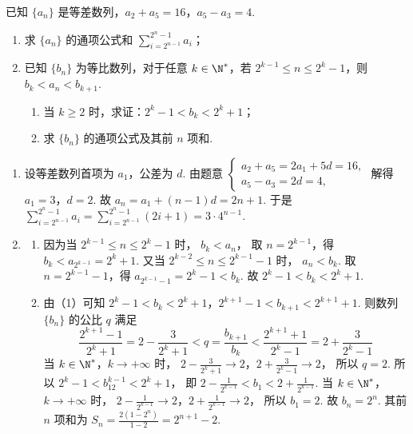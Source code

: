 \begin{problem}
已知 \(\{a_n\}\) 是等差数列，\(a_2+a_5=16\)，\(a_5-a_3=4\).

\begin{enumerate}
\item 求 \(\{a_n\}\) 的通项公式和 \(\displaystyle\sum_{i=2^{n-1}}^{2^n-1}a_i\)；
\item 已知 \(\{b_n\}\) 为等比数列，对于任意 \(k\in \N^*\)，若 \(2^{k-1}\le n\le 2^k-1\)，则 \(b_k<a_n<b_{k+1}\).

    \begin{enumerate}
    \item 当 \(k\ge 2\) 时，求证：\(2^k-1<b_k<2^k+1\)；
    \item 求 \(\{b_n\}\) 的通项公式及其前 \(n\) 项和.
    \end{enumerate}
\end{enumerate}
\end{problem}

\begin{solution}
\begin{enumerate}
\item 设等差数列首项为 \(a_1\)，公差为 \(d\). 由题意 \(\begin{cases}
a_2+a_5=2a_1+5d=16,\\
a_5-a_3=2d=4,
\end{cases}\) 解得
\(a_1=3\)，\(d=2\).
故
\(a_n=a_1+(n-1)d=2n+1\).
于是 \(\sum_{i=2^{n-1}}^{2^n-1}a_i=\sum_{i=2^{n-1}}^{2^n-1}(2i+1)=3\cdot 4^{n-1}\).

\item
    \begin{enumerate}
    \item 因为当 \(2^{k-1}\le n\le 2^k-1\) 时，
\(b_k<a_n\)，
取 \(n=2^{k-1}\)，得
\(b_k<a_{2^{k-1}}=2^k+1\).
又当 \(2^{k-2}\le n\le 2^{k-1}-1\) 时，
\(a_n<b_k\).
取 \(n=2^{k-1}-1\)，得
\(a_{2^{k-1}-1}=2^k-1<b_k\).
故 \(2^k-1<b_k<2^k+1\).

    \item 由（1）可知
\(2^k-1<b_k<2^k+1\)，\(2^{k+1}-1<b_{k+1}<2^{k+1}+1\).
则数列 \(\{b_n\}\) 的公比 \(q\) 满足
\[
\frac{2^{k+1}-1}{2^k+1}
=2-\frac{3}{2^k+1}
<q
=\frac{b_{k+1}}{b_k}
<\frac{2^{k+1}+1}{2^k-1}
=2+\frac{3}{2^k-1}
\]
当 \(k\in \N^*\)，\(k\to +\infty\) 时，
\(2-\frac{3}{2^k+1}\to 2\)，\(2+\frac{3}{2^k-1}\to 2\)，
所以 \(q=2\).
所以
\(2^k-1<b_12^{k-1}<2^k+1\)，
即
\(2-\frac{1}{2^{k-1}}<b_1<2+\frac{1}{2^{k-1}}\).
当 \(k\in \N^*\)，\(k\to +\infty\) 时，
\(2-\frac{1}{2^{k-1}}\to 2\)，\(2+\frac{1}{2^{k-1}}\to 2\)，
所以 \(b_1=2\). 故
\(b_n=2^n\).
其前 \(n\) 项和为
\(S_n=\frac{2(1-2^n)}{1-2}=2^{n+1}-2\).
    \end{enumerate}
\end{enumerate}
\end{solution}

